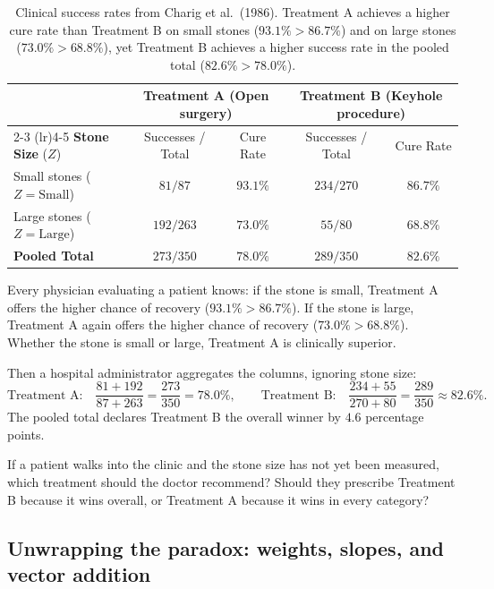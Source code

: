 \begin{table}[H]
\centering
\small
\begin{tabular}{lcccc}
\toprule
& \multicolumn{2}{c}{\textbf{Treatment A} (Open surgery)} & \multicolumn{2}{c}{\textbf{Treatment B} (Keyhole procedure)} \\
\cmidrule(lr){2-3} \cmidrule(lr){4-5}
\textbf{Stone Size} ($Z$) & Successes / Total & Cure Rate & Successes / Total & Cure Rate \\
\midrule
Small stones ($Z = \text{Small}$) & $81 / 87$ & $\mathbf{93.1\%}$ & $234 / 270$ & $86.7\%$ \\
Large stones ($Z = \text{Large}$) & $192 / 263$ & $\mathbf{73.0\%}$ & $55 / 80$ & $68.8\%$ \\
\midrule
\textbf{Pooled Total} & $273 / 350$ & $78.0\%$ & $289 / 350$ & $\mathbf{82.6\%}$ \\
\bottomrule
\end{tabular}
\caption{Clinical success rates from Charig et al.~(1986). Treatment A achieves a higher cure rate than Treatment B on small stones ($93.1\% > 86.7\%$) and on large stones ($73.0\% > 68.8\%$), yet Treatment B achieves a higher success rate in the pooled total ($82.6\% > 78.0\%$).}
\label{ch15:tab-kidney-stones}
\end{table}

Every physician evaluating a patient knows: if the stone is small, Treatment A offers the higher chance of recovery ($93.1\% > 86.7\%$). If the stone is large, Treatment A again offers the higher chance of recovery ($73.0\% > 68.8\%$). Whether the stone is small or large, Treatment A is clinically superior.

Then a hospital administrator aggregates the columns, ignoring stone size:
\[
  \text{Treatment A:}\quad \frac{81 + 192}{87 + 263} = \frac{273}{350} = 78.0\%, \qquad
  \text{Treatment B:}\quad \frac{234 + 55}{270 + 80} = \frac{289}{350} \approx 82.6\%.
\]
The pooled total declares Treatment B the overall winner by $4.6$ percentage points.

If a patient walks into the clinic and the stone size has not yet been measured, which treatment should the doctor recommend? Should they prescribe Treatment B because it wins overall, or Treatment A because it wins in every category?

\subsection{Unwrapping the paradox: weights, slopes, and vector addition}
\label{ch15:vector-addition}

